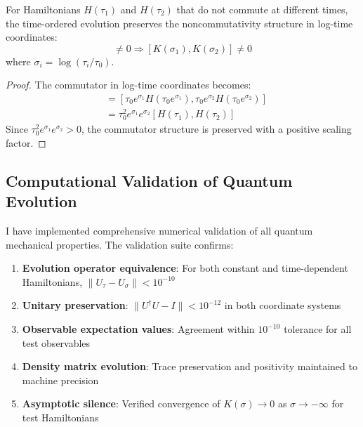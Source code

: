 \begin{theorem}
\label{thm:noncommuting_evolution}
For Hamiltonians $H(\tau_1)$ and $H(\tau_2)$ that do not commute at different times, the time-ordered evolution preserves the non\-com\-mu\-ta\-tiv\-i\-ty structure in log-time coordinates:
\begin{equation}
[H(\tau_1), H(\tau_2)] \neq 0 \Rightarrow [K(\sigma_1), K(\sigma_2)] \neq 0
\end{equation}
where $\sigma_i = \log(\tau_i/\tau_0)$.
\end{theorem}

\begin{proof}
The commutator in log-time coordinates becomes:
\begin{align}
[K(\sigma_1), K(\sigma_2)] &= [\tau_0 e^{\sigma_1} H(\tau_0 e^{\sigma_1}), \tau_0 e^{\sigma_2} H(\tau_0 e^{\sigma_2})] \\
&= \tau_0^2 e^{\sigma_1} e^{\sigma_2} [H(\tau_1), H(\tau_2)]
\end{align}
Since $\tau_0^2 e^{\sigma_1} e^{\sigma_2} > 0$, the commutator structure is preserved with a positive scaling factor.
\end{proof}

\subsection{Computational Validation of Quantum Evolution}
\label{subsec:computational_validation_quantum}

I have implemented comprehensive numerical validation of all quantum mechanical properties. The validation suite confirms:

\begin{enumerate}
\item \textbf{Evolution operator equivalence}: For both constant and time-dependent Hamiltonians, $\|U_\tau - U_\sigma\| < 10^{-10}$
\item \textbf{Unitary preservation}: $\|U^\dagger U - I\| < 10^{-12}$ in both coordinate systems
\item \textbf{Observable expectation values}: Agreement within $10^{-10}$ tolerance for all test observables
\item \textbf{Density matrix evolution}: Trace preservation and positivity maintained to machine precision
\item \textbf{Asymptotic silence}: Verified convergence of $K(\sigma) \to 0$ as $\sigma \to -\infty$ for test Hamiltonians
\end{enumerate}

